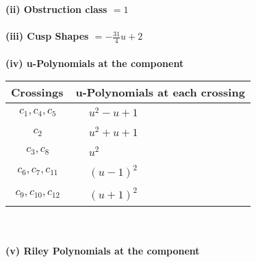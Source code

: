 \documentclass[1p]{elsarticle_modified}
\theoremstyle{definition}
\begin{document}
\flushleft \textbf{(ii) Obstruction class $= 1$}\\~\\
\flushleft \textbf{(iii) Cusp Shapes $= -\frac{31}{4} u+2$}\\~\\
\newpage\renewcommand{\arraystretch}{1}
\flushleft \textbf{(iv) u-Polynomials at the component}\newline \\
\begin{tabular}{m{50pt}|m{274pt}}
Crossings & \hspace{64pt}u-Polynomials at each crossing \\
\hline $$\begin{aligned}c_{1},c_{4},c_{5}\end{aligned}$$&$\begin{aligned}
&u^2- u+1
\end{aligned}$\\
\hline $$\begin{aligned}c_{2}\end{aligned}$$&$\begin{aligned}
&u^2+u+1
\end{aligned}$\\
\hline $$\begin{aligned}c_{3},c_{8}\end{aligned}$$&$\begin{aligned}
&u^2
\end{aligned}$\\
\hline $$\begin{aligned}c_{6},c_{7},c_{11}\end{aligned}$$&$\begin{aligned}
&(u-1)^2
\end{aligned}$\\
\hline $$\begin{aligned}c_{9},c_{10},c_{12}\end{aligned}$$&$\begin{aligned}
&(u+1)^2
\end{aligned}$\\
\hline
\end{tabular}\\~\\
\newpage\renewcommand{\arraystretch}{1}
\flushleft \textbf{(v) Riley Polynomials at the component}\newline \\
\end{document}
